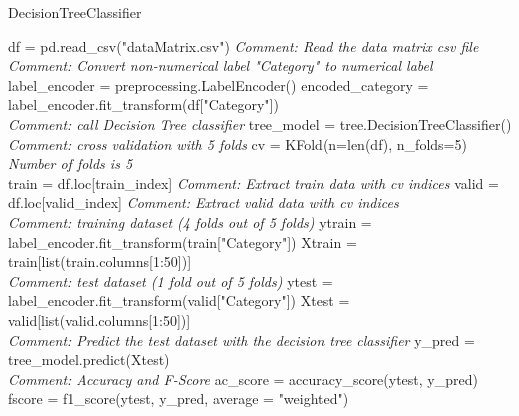 \documentclass[journal,onecolumn]{IEEEtran}
\begin{document}
\begin{algorithm}
\caption{DecisionTreeClassifier}\label{tree}
\begin{algorithmic}[1]


\State df = pd.read\_csv("dataMatrix.csv") \textit{Comment: Read the data matrix csv file}\\

\State \textit{Comment: Convert non-numerical label "Category" to numerical label}
\State label\_encoder = preprocessing.LabelEncoder()
\State encoded\_category = label\_encoder.fit\_transform(df["Category"]) \\

\State \textit{Comment: call Decision Tree classifier}
\State tree\_model = tree.DecisionTreeClassifier() \label{classifierStep} \\

\State \textit{Comment: cross validation with 5 folds}
\State cv = KFold(n=len(df), n\_folds=5)     \textit{Number of folds is 5}   \\  
       
\State train = df.loc[train\_index]  \textit{Comment: Extract train data with cv indices}
\State valid = df.loc[valid\_index] \textit{Comment: Extract valid data with cv indices} \\

\State \textit{Comment: training dataset (4 folds out of 5 folds)}
\State ytrain = label\_encoder.fit\_transform(train["Category"])
\State Xtrain = train[list(train.columns[1:50])] \\

\State \textit{ Comment: test dataset (1 fold out of 5 folds)}
\State ytest = label\_encoder.fit\_transform(valid["Category"])
\State Xtest = valid[list(valid.columns[1:50])] \\

\State \textit{Comment: Predict the test dataset with the decision tree classifier}
\State y\_pred = tree\_model.predict(Xtest) \\

\State \textit{Comment: Accuracy and F-Score}
\State ac\_score = accuracy\_score(ytest, y\_pred)
\State fscore = f1\_score(ytest, y\_pred, average = "weighted")

\EndFor

\EndProcedure
\end{algorithmic}
\end{algorithm}
\end{document}
